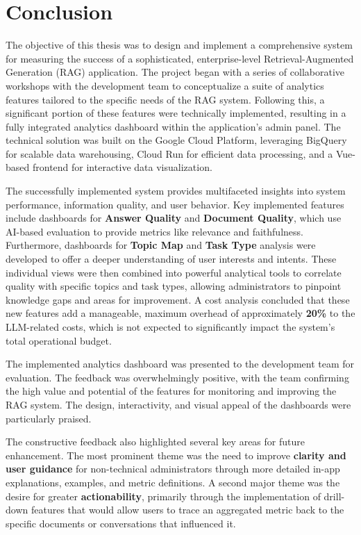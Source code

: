 \documentclass[
	english,
	ruledheaders=section,%
	class=report,%
	thesis={type=bachelor},%
	accentcolor=1b,%
	custommargins=true,%
	marginpar=false,%
	parskip=half-,%
	fontsize=11pt,%
	DIV=14,
]{tudapub}
\begin{document}
\chapter{Conclusion}
The objective of this thesis was to design and implement a comprehensive system for measuring the success of a sophisticated, enterprise-level Retrieval-Augmented Generation (RAG) application. The project began with a series of collaborative workshops with the development team to conceptualize a suite of analytics features tailored to the specific needs of the RAG system. Following this, a significant portion of these features were technically implemented, resulting in a fully integrated analytics dashboard within the application's admin panel. The technical solution was built on the Google Cloud Platform, leveraging BigQuery for scalable data warehousing, Cloud Run for efficient data processing, and a Vue-based frontend for interactive data visualization.

The successfully implemented system provides multifaceted insights into system performance, information quality, and user behavior. Key implemented features include dashboards for \textbf{Answer Quality} and \textbf{Document Quality}, which use AI-based evaluation to provide metrics like relevance and faithfulness. Furthermore, dashboards for \textbf{Topic Map} and \textbf{Task Type} analysis were developed to offer a deeper understanding of user interests and intents. These individual views were then combined into powerful analytical tools to correlate quality with specific topics and task types, allowing administrators to pinpoint knowledge gaps and areas for improvement. A cost analysis concluded that these new features add a manageable, maximum overhead of approximately \textbf{20\%} to the LLM-related costs, which is not expected to significantly impact the system's total operational budget.

The implemented analytics dashboard was presented to the development team for evaluation. The feedback was overwhelmingly positive, with the team confirming the high value and potential of the features for monitoring and improving the RAG system. The design, interactivity, and visual appeal of the dashboards were particularly praised.

The constructive feedback also highlighted several key areas for future enhancement. The most prominent theme was the need to improve \textbf{clarity and user guidance} for non-technical administrators through more detailed in-app explanations, examples, and metric definitions. A second major theme was the desire for greater \textbf{actionability}, primarily through the implementation of drill-down features that would allow users to trace an aggregated metric back to the specific documents or conversations that influenced it.
\end{document}
